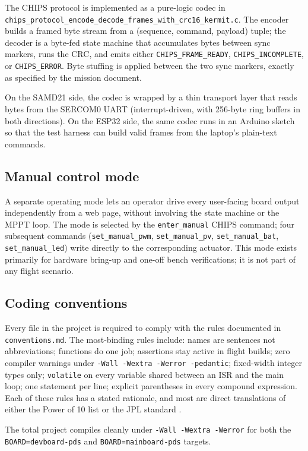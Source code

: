 The CHIPS protocol is implemented as a pure-logic codec in
\texttt{chips\_protocol\_encode\_decode\_frames\_with\_crc16\_kermit.c}.
The encoder builds a framed byte stream from a (sequence, command,
payload) tuple; the decoder is a byte-fed state machine that
accumulates bytes between sync markers, runs the CRC, and emits
either \texttt{CHIPS\_FRAME\_READY}, \texttt{CHIPS\_INCOMPLETE},
or \texttt{CHIPS\_ERROR}. Byte stuffing is applied between the two
sync markers, exactly as specified by the mission document.

On the SAMD21 side, the codec is wrapped by a thin transport layer
that reads bytes from the SERCOM0 UART (interrupt-driven, with
256-byte ring buffers in both directions). On the ESP32 side, the
same codec runs in an Arduino sketch so that the test harness can
build valid frames from the laptop's plain-text commands.

\subsection{Manual control mode}

A separate operating mode lets an operator drive every user-facing
board output independently from a web page, without involving the
state machine or the MPPT loop. The mode is selected by the
\texttt{enter\_manual} CHIPS command; four subsequent commands
(\texttt{set\_manual\_pwm}, \texttt{set\_manual\_pv},
\texttt{set\_manual\_bat}, \texttt{set\_manual\_led}) write directly
to the corresponding actuator. This mode exists primarily for
hardware bring-up and one-off bench verifications; it is not part
of any flight scenario.

\subsection{Coding conventions}

Every file in the project is required to comply with the rules
documented in \texttt{conventions.md}. The most-binding rules
include: names are sentences not abbreviations; functions do one
job; assertions stay active in flight builds; zero compiler
warnings under \texttt{-Wall -Wextra -Werror -pedantic};
fixed-width integer types only; \texttt{volatile} on every
variable shared between an ISR and the main loop; one statement
per line; explicit parentheses in every compound expression. Each
of these rules has a stated rationale, and most are direct
translations of either the Power of 10 list
\cite{holzmann_powerof10_2006} or the JPL standard
\cite{jpl_d60411_2009}.

The total project compiles cleanly under
\texttt{-Wall -Wextra -Werror} for both the
\texttt{BOARD=devboard-pds} and \texttt{BOARD=mainboard-pds}
targets.
